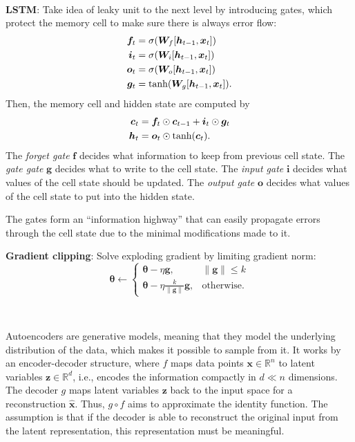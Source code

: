 \documentclass{article}
\newcommand{\lft}{\mathopen{}\mathclose\bgroup\left}
\newcommand{\rgt}{\aftergroup\egroup\right}
\newcommand{\R}{\mathbb{R}}
\renewcommand{\vec}[1]{\bm{#1}}
\newcommand{\mat}[1]{\bm{#1}}
\newenvironment{topic}[1]
{\textbf{\sffamily \colorbox{black}{\rlap{\textbf{\textcolor{white}{#1}}}\hspace{\linewidth}\hspace{-2\fboxsep}}} \\ \vspace{0.2cm}}
{}
\begin{document}
\begin{multicols*}{2}
\begin{topic}{Recurrent neural networks}
        \textbf{LSTM}: Take idea of leaky unit to the next level by introducing gates, which protect the memory cell to make sure there is always error flow:
        \begin{align*}
            \vec{f}_t & = \sigma \lft( \mat{W}_{f} [\vec{h}_{t-1}, \vec{x}_t] \rgt) \\
            \vec{i}_t & = \sigma \lft( \mat{W}_{i} [\vec{h}_{t-1}, \vec{x}_t] \rgt) \\
            \vec{o}_t & = \sigma \lft( \mat{W}_{o} [\vec{h}_{t-1}, \vec{x}_t] \rgt) \\
            \vec{g}_t & = \tanh \lft( \mat{W}_{g} [\vec{h}_{t-1}, \vec{x}_t] \rgt).
        \end{align*}
        Then, the memory cell and hidden state are computed by
        \begin{align*}
            \vec{c}_t & = \vec{f}_t \odot \vec{c}_{t-1} + \vec{i}_t \odot \vec{g}_t \\
            \vec{h}_t & = \vec{o}_t \odot \tanh \lft( \vec{c}_t \rgt).
        \end{align*}
        The \textit{forget gate} $\vec{f}$ decides what information to keep from previous cell state. The \textit{gate
            gate} $\vec{g}$ decides what to write to the cell state. The \textit{input gate} $\vec{i}$ decides what
        values of the cell state should be updated. The \textit{output gate} $\vec{o}$ decides what values of
        the cell state to put into the hidden state.

        The gates form an ``information highway'' that can easily propagate errors through the cell state
        due to the minimal modifications made to it.

        \textbf{Gradient clipping}: Solve exploding gradient by limiting gradient norm: \[
            \vec{\theta} \gets \begin{cases}
                \vec{\theta} - \eta \vec{g},                         & \| \vec{g} \| \leq k \\
                \vec{\theta} - \eta \frac{k}{\| \vec{g} \|} \vec{g}, & \text{otherwise}.
            \end{cases}
        \]

    \end{topic}

    \begin{topic}{Autoencoders}

        Autoencoders are generative models, meaning that they model the underlying distribution of the
        data, which makes it possible to sample from it. It works by an encoder-decoder structure, where
        $f$ maps data points $\vec{x} \in \R^n$ to latent variables $\vec{z} \in \R^d$, i.e., encodes the
        information compactly in $d \ll n$ dimensions. The decoder $g$ maps latent variables $\vec{z}$ back
        to the input space for a reconstruction $\hat{\vec{x}}$. Thus, $g \circ f$ aims to approximate the
        identity function. The assumption is that if the decoder is able to reconstruct the original input
        from the latent representation, this representation must be meaningful.


\end{topic}
\end{multicols*}
\end{document}
